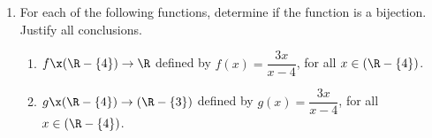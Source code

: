\begin{enumerate}
\item \label{exer:forexample} For each of the following functions, determine if the function is a bijection.  Justify all conclusions.
\begin{enumerate}
\yitem $F\x\mathbb{R} \to \mathbb{R}$  defined by  $F( x ) = 5x + 3$, for all  $x \in \mathbb{R}$.  

\yitem $G\x\Z \to \Z$  defined by  $G( x ) = 5x + 3$, for all  $x \in \Z$.

\item $f\x ( \R -\left\{ 4 \right\} ) \to \R$ defined  by $f ( x ) = \dfrac{3x}{x - 4}$, for all 
          $x \in \left( \R - \{ 4 \} \right)$.  

\item $g\x ( \R -\left\{ 4 \right\} ) \to ( \R - \left\{ 3 \right\} )$ defined by $g ( x ) = \dfrac{3x}{x - 4}$,  for all \linebreak$x \in \left( \R - \{ 4 \} \right)$.   
\end{enumerate}


%
%



\end{enumerate}
